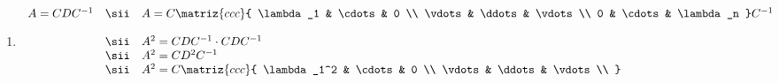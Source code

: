 \begin{enumerate}[label=\arabic*.]
  \item
        $$
          \begin{array}{rcl}
            A = CDC^{-1}
                        & \sii                                                                                                                                &
            A = C
            \matriz{ccc}{
            \lambda_1   & \cdots                                                                                                                              & 0           \\
            \vdots      & \ddots                                                                                                                              & \vdots      \\
            0           & \cdots                                                                                                                              & \lambda_n
            }
            C^{-1}                                                                                                                                                          \\\\
                        & \sii                                                                                                                                &
            A^2 = CDC^{-1} \cdot CDC^{-1}                                                                                                                                   \\
                        & \sii                                                                                                                                &
            A^2 = CD^2C^{-1}                                                                                                                                                \\
                        & \sii                                                                                                                                &
            A^2 = C
            \matriz{ccc}{
            \lambda_1^2 & \cdots                                                                                                                              & 0           \\
            \vdots      & \ddots                                                                                                                              & \vdots      \\
}
\end{array}$$
\end{enumerate}
